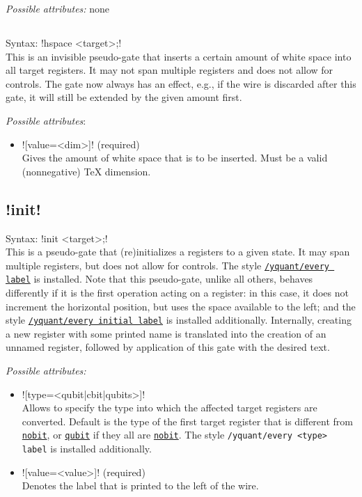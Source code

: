 \documentclass{scrartcl}
\def\gate#1{\hyperref[gate:#1]{\texttt{#1}}}
\def\style#1{\hyperref[style:#1]{\texttt{#1}}}
\begin{document}
         \emph{Possible attributes:} none

      \subsection{\texorpdfstring{}{hspace}}\label{gate:hspace}
         Syntax: \yquant!hspace <target>;! \\
         This is an invisible pseudo\hyp gate that inserts a certain amount of white space into all target registers.
         It may not span multiple registers and does not allow for controls.
         The gate now always has an effect, e.g., if the wire is discarded after this gate, it will still be extended by the given amount first.

         \emph{Possible attributes}:
         \begin{itemize}
            \item \yquant![value=<dim>]! (required) \\
               Gives the amount of white space that is to be inserted. Must be a valid (nonnegative) \TeX{} dimension.
         \end{itemize}

      \subsection[\texorpdfstring{\yquant{init}}{init}]{\yquant!init!}\label{gate:init}
         Syntax: \yquant!init <target>;! \\
         This is a pseudo\hyp gate that (re)initializes a registers to a given state.
         It may span multiple registers, but does not allow for controls.
         The style \style{/yquant/every label} is installed.
         Note that this pseudo\hyp gate, unlike all others, behaves differently if it is the first operation acting on a register: in this case, it does not increment the horizontal position, but uses the space available to the left; and the style \style{/yquant/every initial label} is installed additionally.
         Internally, creating a new register with some printed name is translated into the creation of an unnamed register, followed by application of this gate with the desired text.

         \emph{Possible attributes:}
         \begin{itemize}
            \item \yquant![type=<qubit|cbit|qubits>]! \\
               Allows to specify the type into which the affected target registers are converted.
               Default is the type of the first target register that is different from \gate{nobit}, or \gate{qubit} if they all are \gate{nobit}.
               The style \texttt{/yquant/every <type> label} is installed additionally.
            \item \yquant![value=<value>]! (required) \\
               Denotes the label that is printed to the left of the wire.
         \end{itemize}
\end{document}
